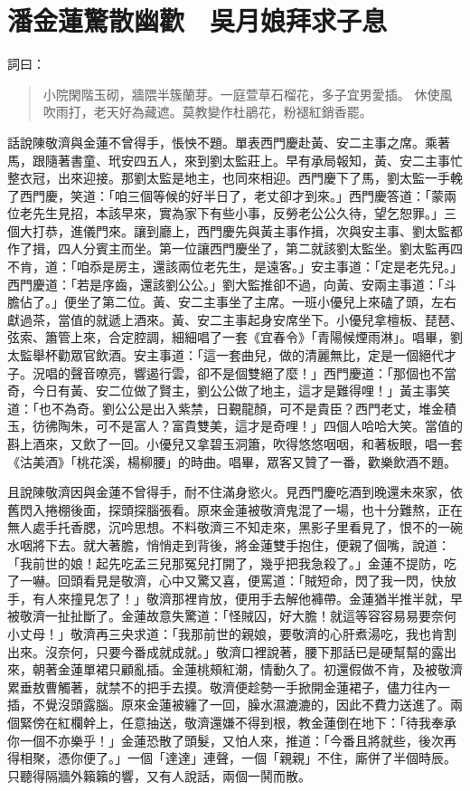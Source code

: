 
\chapter{潘金蓮驚散幽歡　吳月娘拜求子息}

詞曰：
\begin{quote}
小院閑階玉砌，牆隈半簇蘭芽。一庭萱草石榴花，多子宜男愛插。
休使風吹雨打，老天好為藏遮。莫教變作杜鵑花，粉褪紅銷香罷。
\end{quote}

話說陳敬濟與金蓮不曾得手，悵怏不題。單表西門慶赴黃、安二主事之席。乘著馬，跟隨著書童、玳安四五人，來到劉太監莊上。早有承局報知，黃、安二主事忙整衣冠，出來迎接。那劉太監是地主，也同來相迎。西門慶下了馬，劉太監一手輓了西門慶，笑道：「咱三個等候的好半日了，老丈卻才到來。」西門慶答道：「蒙兩位老先生見招，本該早來，實為家下有些小事，反勞老公公久待，望乞恕罪。」三個大打恭，進儀門來。讓到廳上，西門慶先與黃主事作揖，次與安主事、劉太監都作了揖，四人分賓主而坐。第一位讓西門慶坐了，第二就該劉太監坐。劉太監再四不肯，道：「咱忝是房主，還該兩位老先生，是遠客。」安主事道：「定是老先兒。」西門慶道：「若是序齒，還該劉公公。」劉大監推卻不過，向黃、安兩主事道：「斗膽佔了。」便坐了第二位。黃、安二主事坐了主席。一班小優兒上來磕了頭，左右獻過茶，當值的就遞上酒來。黃、安二主事起身安席坐下。小優兒拿檀板、琵琶、弦索、簫管上來，合定腔調，細細唱了一套《宜春令》「青陽候煙雨淋」。唱畢，劉太監舉杯勸眾官飲酒。安主事道：「這一套曲兒，做的清麗無比，定是一個絕代才子。況唱的聲音嘹亮，響遏行雲，卻不是個雙絕了麼！」西門慶道：「那個也不當奇，今日有黃、安二位做了賢主，劉公公做了地主，這才是難得哩！」黃主事笑道：「也不為奇。劉公公是出入紫禁，日覲龍顏，可不是貴臣？西門老丈，堆金積玉，彷彿陶朱，可不是富人？富貴雙美，這才是奇哩！」四個人哈哈大笑。當值的斟上酒來，又飲了一回。小優兒又拿碧玉洞簫，吹得悠悠咽咽，和著板眼，唱一套《沽美酒》「桃花溪，楊柳腰」的時曲。唱畢，眾客又贊了一番，歡樂飲酒不題。

且說陳敬濟因與金蓮不曾得手，耐不住滿身慾火。見西門慶吃酒到晚還未來家，依舊閃入捲棚後面，探頭探腦張看。原來金蓮被敬濟鬼混了一場，也十分難熬，正在無人處手托香腮，沉吟思想。不料敬濟三不知走來，黑影子里看見了，恨不的一碗水咽將下去。就大著膽，悄悄走到背後，將金蓮雙手抱住，便親了個嘴，說道：「我前世的娘！起先吃孟三兒那冤兒打開了，幾乎把我急殺了。」金蓮不提防，吃了一嚇。回頭看見是敬濟，心中又驚又喜，便罵道：「賊短命，閃了我一閃，快放手，有人來撞見怎了！」敬濟那裡肯放，便用手去解他褲帶。金蓮猶半推半就，早被敬濟一扯扯斷了。金蓮故意失驚道：「怪賊囚，好大膽！就這等容容易易要奈何小丈母！」敬濟再三央求道：「我那前世的親娘，要敬濟的心肝煮湯吃，我也肯割出來。沒奈何，只要今番成就成就。」敬濟口裡說著，腰下那話已是硬幫幫的露出來，朝著金蓮單裙只顧亂插。金蓮桃頰紅潮，情動久了。初還假做不肯，及被敬濟累垂敖曹觸著，就禁不的把手去摸。敬濟便趁勢一手掀開金蓮裙子，儘力往內一插，不覺沒頭露腦。原來金蓮被纏了一回，臊水濕漉漉的，因此不費力送進了。兩個緊傍在紅欄幹上，任意抽送，敬濟還嫌不得到根，教金蓮倒在地下：「待我奉承你一個不亦樂乎！」金蓮恐散了頭髮，又怕人來，推道：「今番且將就些，後次再得相聚，憑你便了。」一個「達達」連聲，一個「親親」不住，廝併了半個時辰。只聽得隔牆外籟籟的響，又有人說話，兩個一鬨而散。

